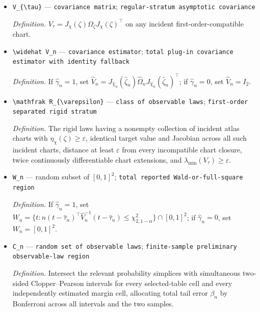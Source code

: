 \documentclass{article}
\begin{document}
\begin{itemize}
  \par\smallskip\noindent\emph{Definition.} \(\widehat\tau_n=F_{\widehat\chi_n}(\widehat\zeta_n)\), so \(\widehat\tau_n=(0,0)\) when \(\widehat\chi_n=\bot\).
  \item \texttt{V\_\allowbreak{}\{\textbackslash{}\allowbreak{}tau\}\allowbreak{}} --- \texttt{covariance matrix}; \texttt{regular-\allowbreak{}stratum asymptotic covariance}
  \par\smallskip\noindent\emph{Definition.} \(V_{\tau}=J_{\chi}(\zeta)\Omega_{\zeta}J_{\chi}(\zeta)^{\top}\) on any incident first-order-compatible chart.
  \item \texttt{\textbackslash{}\allowbreak{}widehat V\_\allowbreak{}n} --- \texttt{covariance estimator}; \texttt{total plug-\allowbreak{}in covariance estimator with identity fallback}
  \par\smallskip\noindent\emph{Definition.} If \(\widehat\gamma_n=1\), set \(\widehat V_n=J_{\widehat\chi_n}(\widehat\zeta_n)\widehat\Omega_nJ_{\widehat\chi_n}(\widehat\zeta_n)^{\top}\); if \(\widehat\gamma_n=0\), set \(\widehat V_n=I_2\).
  \item \texttt{\textbackslash{}\allowbreak{}mathfrak R\_\allowbreak{}\{\textbackslash{}\allowbreak{}varepsilon\}\allowbreak{}} --- \texttt{class of observable laws}; \texttt{first-\allowbreak{}order separated rigid stratum}
  \par\smallskip\noindent\emph{Definition.} The rigid laws having a nonempty collection of incident atlas charts with \(\eta_{\chi}(\zeta)\ge\varepsilon\), identical target value and Jacobian across all such incident charts, distance at least \(\varepsilon\) from every incompatible chart closure, twice continuously differentiable chart extensions, and \(\lambda_{\min}(V_{\tau})\ge\varepsilon\).
  \item \texttt{W\_\allowbreak{}n} --- random subset of \([0,1]^2\); \texttt{total reported Wald-\allowbreak{}or-\allowbreak{}full-\allowbreak{}square region}
  \par\smallskip\noindent\emph{Definition.} If \(\widehat\gamma_n=1\), set \(W_n=\{t:n(t-\widehat\tau_n)^{\top}\widehat V_n^{-1}(t-\widehat\tau_n)\le\chi^2_{2,1-\alpha}\}\cap[0,1]^2\); if \(\widehat\gamma_n=0\), set \(W_n=[0,1]^2\).
  \item \texttt{C\_\allowbreak{}n} --- \texttt{random set of observable laws}; \texttt{finite-\allowbreak{}sample preliminary observable-\allowbreak{}law region}
  \par\smallskip\noindent\emph{Definition.} Intersect the relevant probability simplices with simultaneous two-sided Clopper--Pearson intervals for every selected-table cell and every independently estimated margin cell, allocating total tail error \(\beta_n\) by Bonferroni across all intervals and the two samples.

\end{itemize}
\end{document}

